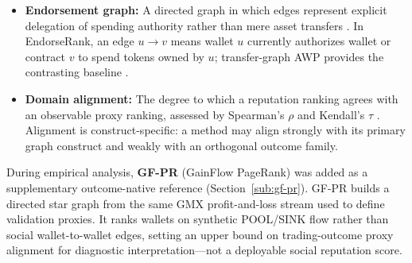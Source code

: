 \begin{itemize}
\item \textbf{Endorsement graph:} A directed graph in which edges represent explicit delegation of spending authority rather than mere asset transfers . In EndorseRank, an edge $u \to v$ means wallet $u$ currently authorizes wallet or contract $v$ to spend tokens owned by $u$; transfer-graph AWP provides the contrasting baseline .
\item \textbf{Domain alignment:} The degree to which a reputation ranking agrees with an observable proxy ranking, assessed by Spearman's $\rho$ and Kendall's $\tau$ . Alignment is construct-specific: a method may align strongly with its primary graph construct and weakly with an orthogonal outcome family.
\end{itemize}


During empirical analysis, \textbf{GF-PR} (GainFlow PageRank) was added as a supplementary outcome-native reference (Section~\ref{sub:gf-pr}). GF-PR builds a directed star graph from the same GMX profit-and-loss stream used to define validation proxies. It ranks wallets on synthetic POOL/SINK flow rather than social wallet-to-wallet edges, setting an upper bound on trading-outcome proxy alignment for diagnostic interpretation---not a deployable social reputation score.

\begin{table}[htbp]
\centering
\caption{Supplementary extension added during empirical work (not part of the primary EndorseRank--AWP research question).}
\label{tab:supplementary-gf-pr}
\end{table}

